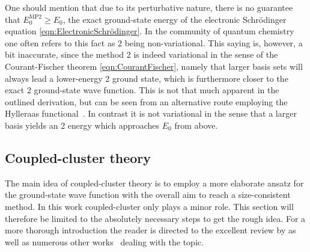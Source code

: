 One should mention that due to its perturbative nature,
there is no guarantee that $E_0^\text{MP2} \geq E_0$,
the exact ground-state energy of the electronic Schrödinger equation \eqref{eqn:ElectronicSchrödinger}.
In the community of quantum chemistry one often refers
to this fact as {\MP}2 being non-variational.
This saying is, however, a bit inaccurate,
since the method {\MP}2 is indeed variational
in the sense of the Courant-Fischer theorem \eqref{eqn:CourantFischer},
namely that larger basis sets will always lead a lower-energy {\MP}2 ground state,
which is furthermore closer to the exact {\MP}2 ground-state wave function.
This is not that much apparent in the outlined derivation,
but can be seen from an alternative route
employing the Hylleraas functional~\cite{Helgaker2013}.
In contrast it is not variational in the sense that
a larger basis yields an {\MP}2 energy
which approaches $E_0$ from above.

\subsection{Coupled-cluster theory}
\defineabbr{CC}{CC\xspace}{Coupled cluster}
\label{sec:CC}

The main idea of coupled-cluster theory
is to employ a more elaborate ansatz for the ground-state wave function
with the overall aim to
reach a size-consistent method.
In this work coupled-cluster only plays a minor role.
This section will therefore be limited to the absolutely necessary
steps to get the rough idea.
For a more thorough introduction the reader is directed
to the excellent review by \citet{Crawford2007}
as well as numerous other works~\cite{Helgaker2013,Hodecker2016}
dealing with the topic.

